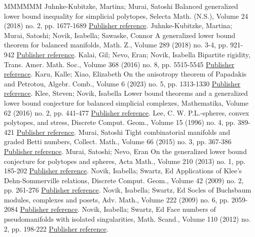 \begin{thebibliography}{MMMMMM}
 Juhnke-Kubitzke, Martina; Murai, Satoshi Balanced generalized lower bound inequality for simplicial polytopes, Selecta Math. (N.S.), Volume 24 (2018) no. 2, pp. 1677-1689 \href{https://alco.centre-mersenne.org/articles/10.5802/alco.419/#JM}{Publisher reference}.
 Juhnke-Kubitzke, Martina; Murai, Satoshi; Novik, Isabella; Sawaske, Connor A generalized lower bound theorem for balanced manifolds, Math. Z., Volume 289 (2018) no. 3-4, pp. 921-942 \href{https://alco.centre-mersenne.org/articles/10.5802/alco.419/#JMNS}{Publisher reference}.
 Kalai, Gil; Nevo, Eran; Novik, Isabella Bipartite rigidity, Trans. Amer. Math. Soc., Volume 368 (2016) no. 8, pp. 5515-5545 \href{https://alco.centre-mersenne.org/articles/10.5802/alco.419/#KNN}{Publisher reference}.
 Karu, Kalle; Xiao, Elizabeth On the anisotropy theorem of Papadakis and Petrotou, Algebr. Comb., Volume 6 (2023) no. 5, pp. 1313-1330 \href{https://alco.centre-mersenne.org/articles/10.5802/alco.419/#KX}{Publisher reference}.
 Klee, Steven; Novik, Isabella Lower bound theorems and a generalized lower bound conjecture for balanced simplicial complexes, Mathematika, Volume 62 (2016) no. 2, pp. 441-477 \href{https://alco.centre-mersenne.org/articles/10.5802/alco.419/#KN}{Publisher reference}.
 Lee, C. W. P.L.-spheres, convex polytopes, and stress, Discrete Comput. Geom., Volume 15 (1996) no. 4, pp. 389-421 \href{https://alco.centre-mersenne.org/articles/10.5802/alco.419/#Lee}{Publisher reference}.
 Murai, Satoshi Tight combinatorial manifolds and graded Betti numbers, Collect. Math., Volume 66 (2015) no. 3, pp. 367-386 \href{https://alco.centre-mersenne.org/articles/10.5802/alco.419/#Mu}{Publisher reference}.
 Murai, Satoshi; Nevo, Eran On the generalized lower bound conjecture for polytopes and spheres, Acta Math., Volume 210 (2013) no. 1, pp. 185-202 \href{https://alco.centre-mersenne.org/articles/10.5802/alco.419/#MN}{Publisher reference}.
 Novik, Isabella; Swartz, Ed Applications of Klee’s Dehn-Sommerville relations, Discrete Comput. Geom., Volume 42 (2009) no. 2, pp. 261-276 \href{https://alco.centre-mersenne.org/articles/10.5802/alco.419/#NS}{Publisher reference}.
 Novik, Isabella; Swartz, Ed Socles of Buchsbaum modules, complexes and posets, Adv. Math., Volume 222 (2009) no. 6, pp. 2059-2084 \href{https://alco.centre-mersenne.org/articles/10.5802/alco.419/#NS09}{Publisher reference}.
 Novik, Isabella; Swartz, Ed Face numbers of pseudomanifolds with isolated singularities, Math. Scand., Volume 110 (2012) no. 2, pp. 198-222 \href{https://alco.centre-mersenne.org/articles/10.5802/alco.419/#NS12}{Publisher reference}.

\end{thebibliography}
